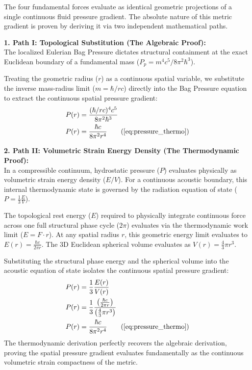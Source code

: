 \documentclass[11pt, a4paper]{article}
\begin{document}
The four fundamental forces evaluate as identical geometric projections of a single continuous fluid pressure gradient. The absolute nature of this metric gradient is proven by deriving it via two independent mathematical paths.

\textbf{1. Path I: Topological Substitution (The Algebraic Proof):} \\
The localized Eulerian Bag Pressure dictates structural containment at the exact Euclidean boundary of a fundamental mass ($P_p = m^4 c^5 / 8\pi^2 \hbar^3$). 

Treating the geometric radius ($r$) as a continuous spatial variable, we substitute the inverse mass-radius limit ($m = \hbar/rc$) directly into the Bag Pressure equation to extract the continuous spatial pressure gradient:
\begin{align}
    P(r) &= \frac{(\hbar / rc)^4 c^5}{8\pi^2 \hbar^3} \nonumber \\
    P(r) &= \frac{\hbar c}{8\pi^2 r^4} \tag{\ref{eq:pressure_thermo}}
\end{align}

\textbf{2. Path II: Volumetric Strain Energy Density (The Thermodynamic Proof):} \\
In a compressible continuum, hydrostatic pressure ($P$) evaluates physically as volumetric strain energy density ($E/V$). For a continuous acoustic boundary, this internal thermodynamic state is governed by the radiation equation of state ($P = \frac{1}{3} \frac{E}{V}$). 

The topological rest energy ($E$) required to physically integrate continuous force across one full structural phase cycle ($2\pi$) evaluates via the thermodynamic work limit ($E = F \cdot r$). At any spatial radius $r$, this geometric energy limit evaluates to $E(r) = \frac{\hbar c}{2\pi r}$. The 3D Euclidean spherical volume evaluates as $V(r) = \frac{4}{3}\pi r^3$. 

Substituting the structural phase energy and the spherical volume into the acoustic equation of state isolates the continuous spatial pressure gradient:
\begin{align}
    P(r) &= \frac{1}{3} \frac{E(r)}{V(r)}  \\
    P(r) &= \frac{1}{3} \frac{\left( \frac{\hbar c}{2\pi r} \right)}{\left( \frac{4}{3}\pi r^3 \right)} \nonumber \\
    P(r) &= \frac{\hbar c}{8\pi^2 r^4} \tag{\ref{eq:pressure_thermo}}
\end{align}
The thermodynamic derivation perfectly recovers the algebraic derivation, proving the spatial pressure gradient evaluates fundamentally as the continuous volumetric strain compactness of the metric.
\end{document}
